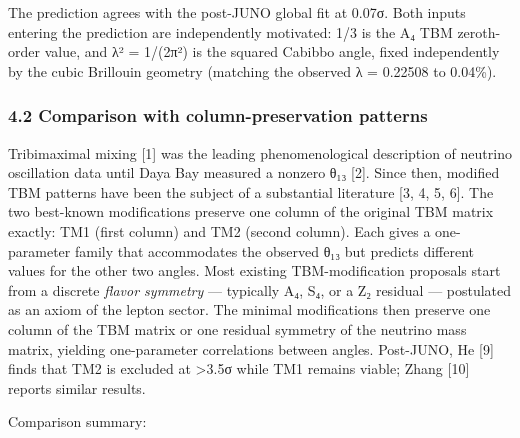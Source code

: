 \documentclass[
  11pt,
  letterpaper,
]{article}
\begin{document}
The prediction agrees with the post-JUNO global fit at 0.07σ. Both
inputs entering the prediction are independently motivated: 1/3 is the
A₄ TBM zeroth-order value, and λ² = 1/(2π²) is the squared Cabibbo
angle, fixed independently by the cubic Brillouin geometry (matching the
observed λ = 0.22508 to 0.04\%).

\hypertarget{comparison-with-column-preservation-patterns}{%
\subsubsection{4.2 Comparison with column-preservation
patterns}\label{comparison-with-column-preservation-patterns}}

Tribimaximal mixing {[}1{]} was the leading phenomenological description
of neutrino oscillation data until Daya Bay measured a nonzero θ₁₃
{[}2{]}. Since then, modified TBM patterns have been the subject of a
substantial literature {[}3, 4, 5, 6{]}. The two best-known
modifications preserve one column of the original TBM matrix exactly:
TM1 (first column) and TM2 (second column). Each gives a one-parameter
family that accommodates the observed θ₁₃ but predicts different values
for the other two angles. Most existing TBM-modification proposals start
from a discrete \emph{flavor symmetry} --- typically A₄, S₄, or a Z₂
residual --- postulated as an axiom of the lepton sector. The minimal
modifications then preserve one column of the TBM matrix or one residual
symmetry of the neutrino mass matrix, yielding one-parameter
correlations between angles. Post-JUNO, He {[}9{]} finds that TM2 is
excluded at \textgreater3.5σ while TM1 remains viable; Zhang {[}10{]}
reports similar results.

Comparison summary:
\end{document}
